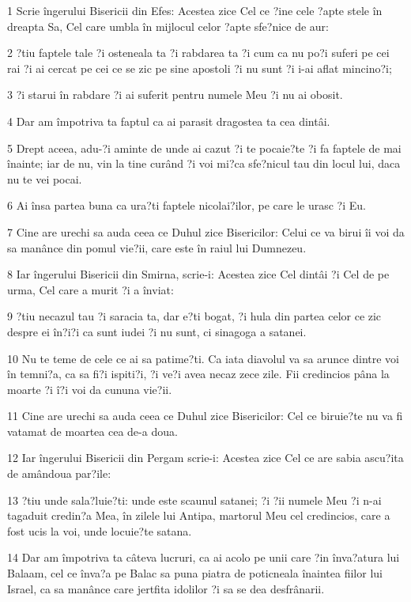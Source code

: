 \par 1 Scrie îngerului Bisericii din Efes: Acestea zice Cel ce ?ine cele ?apte stele în dreapta Sa, Cel care umbla în mijlocul celor ?apte sfe?nice de aur:
\par 2 ?tiu faptele tale ?i osteneala ta ?i rabdarea ta ?i cum ca nu po?i suferi pe cei rai ?i ai cercat pe cei ce se zic pe sine apostoli ?i nu sunt ?i i-ai aflat mincino?i;
\par 3 ?i starui în rabdare ?i ai suferit pentru numele Meu ?i nu ai obosit.
\par 4 Dar am împotriva ta faptul ca ai parasit dragostea ta cea dintâi.
\par 5 Drept aceea, adu-?i aminte de unde ai cazut ?i te pocaie?te ?i fa faptele de mai înainte; iar de nu, vin la tine curând ?i voi mi?ca sfe?nicul tau din locul lui, daca nu te vei pocai.
\par 6 Ai însa partea buna ca ura?ti faptele nicolai?ilor, pe care le urasc ?i Eu.
\par 7 Cine are urechi sa auda ceea ce Duhul zice Bisericilor: Celui ce va birui îi voi da sa manânce din pomul vie?ii, care este în raiul lui Dumnezeu.
\par 8 Iar îngerului Bisericii din Smirna, scrie-i: Acestea zice Cel dintâi ?i Cel de pe urma, Cel care a murit ?i a înviat:
\par 9 ?tiu necazul tau ?i saracia ta, dar e?ti bogat, ?i hula din partea celor ce zic despre ei în?i?i ca sunt iudei ?i nu sunt, ci sinagoga a satanei.
\par 10 Nu te teme de cele ce ai sa patime?ti. Ca iata diavolul va sa arunce dintre voi în temni?a, ca sa fi?i ispiti?i, ?i ve?i avea necaz zece zile. Fii credincios pâna la moarte ?i î?i voi da cununa vie?ii.
\par 11 Cine are urechi sa auda ceea ce Duhul zice Bisericilor: Cel ce biruie?te nu va fi vatamat de moartea cea de-a doua.
\par 12 Iar îngerului Bisericii din Pergam scrie-i: Acestea zice Cel ce are sabia ascu?ita de amândoua par?ile:
\par 13 ?tiu unde sala?luie?ti: unde este scaunul satanei; ?i ?ii numele Meu ?i n-ai tagaduit credin?a Mea, în zilele lui Antipa, martorul Meu cel credincios, care a fost ucis la voi, unde locuie?te satana.
\par 14 Dar am împotriva ta câteva lucruri, ca ai acolo pe unii care ?in înva?atura lui Balaam, cel ce înva?a pe Balac sa puna piatra de poticneala înaintea fiilor lui Israel, ca sa manânce care jertfita idolilor ?i sa se dea desfrânarii.

